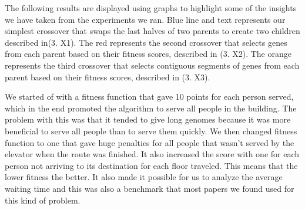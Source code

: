 






The following results are displayed using graphs to highlight some of the insights we have taken from the experiments we ran. Blue line and text represents our simplest crossover that swaps the last halves of two parents to create two children described in(3. X1). The red represents the second crossover that selects genes from each parent based on their fitness scores, described in (3. X2). The orange represents the third crossover that selects contiguous segments of genes from each parent based on their fitness scores, described in (3. X3).

We started of with a fitness function that gave 10 points for each person served, which in the end promoted the algorithm to serve all people in the building. The problem with this was that it tended to give long genomes because it was more beneficial to serve all people than to serve them quickly. We then changed fitness function to one that gave huge penalties for all people that wasn't served by the elevator when the route was finished. It also increased the score with one for each person not arriving to its destination for each floor traveled. This means that the lower fitness the better. It also made it possible for us to analyze the average waiting time and this was also a benchmark that most papers we found used for this kind of problem.

